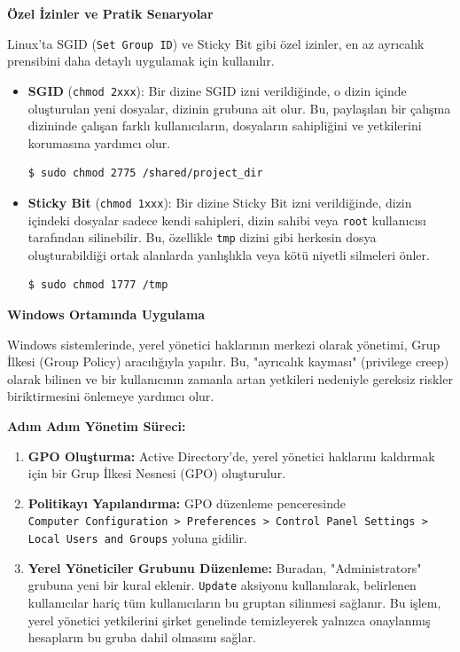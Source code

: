 \textbf{Özel İzinler ve Pratik Senaryolar}

Linux'ta SGID (\texttt{Set Group ID}) ve Sticky Bit gibi özel izinler, en az ayrıcalık prensibini daha detaylı uygulamak için kullanılır.

\begin{itemize}
    \item \textbf{SGID} (\texttt{chmod 2xxx}): Bir dizine SGID izni verildiğinde, o dizin içinde oluşturulan yeni dosyalar, dizinin grubuna ait olur. Bu, paylaşılan bir çalışma dizininde çalışan farklı kullanıcıların, dosyaların sahipliğini ve yetkilerini korumasına yardımcı olur.
    \begin{verbatim}
$ sudo chmod 2775 /shared/project_dir
    \end{verbatim}
    \item \textbf{Sticky Bit} (\texttt{chmod 1xxx}): Bir dizine Sticky Bit izni verildiğinde, dizin içindeki dosyalar sadece kendi sahipleri, dizin sahibi veya \texttt{root} kullanıcısı tarafından silinebilir. Bu, özellikle \texttt{tmp} dizini gibi herkesin dosya oluşturabildiği ortak alanlarda yanlışlıkla veya kötü niyetli silmeleri önler.
    \begin{verbatim}
$ sudo chmod 1777 /tmp
    \end{verbatim}
\end{itemize}

\textbf{Windows Ortamında Uygulama}

Windows sistemlerinde, yerel yönetici haklarının merkezi olarak yönetimi, Grup İlkesi (Group Policy) aracılığıyla yapılır. Bu, "ayrıcalık kayması" (privilege creep) olarak bilinen ve bir kullanıcının zamanla artan yetkileri nedeniyle gereksiz riskler biriktirmesini önlemeye yardımcı olur.

\textbf{Adım Adım Yönetim Süreci:}

\begin{enumerate}
    \item \textbf{GPO Oluşturma:} Active Directory'de, yerel yönetici haklarını kaldırmak için bir Grup İlkesi Nesnesi (GPO) oluşturulur.
    \item \textbf{Politikayı Yapılandırma:} GPO düzenleme penceresinde \\
    \texttt{Computer Configuration > Preferences > Control Panel Settings > \\
    Local Users and Groups} yoluna gidilir.
    \item \textbf{Yerel Yöneticiler Grubunu Düzenleme:} Buradan, "Administrators" grubuna yeni bir kural eklenir. \texttt{Update} aksiyonu kullanılarak, belirlenen kullanıcılar hariç tüm kullanıcıların bu gruptan silinmesi sağlanır. Bu işlem, yerel yönetici yetkilerini şirket genelinde temizleyerek yalnızca onaylanmış hesapların bu gruba dahil olmasını sağlar.
\end{enumerate}

